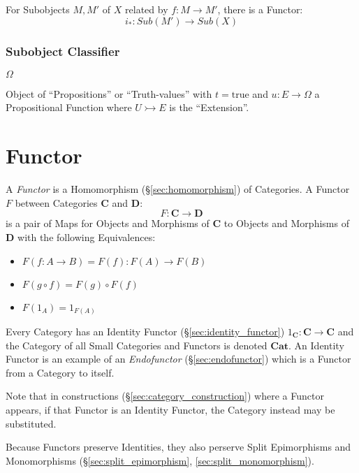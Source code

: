 For Subobjects $M,M'$ of $X$ related by $f : M \rightarrow M'$, there
is a Functor:
\[
  i_* : Sub (M') \rightarrow Sub (X)
\]



\subsubsection{Subobject Classifier}\label{sec:subobject_classifier}

$\Omega$

Object of ``Propositions'' or ``Truth-values'' with $t =
\mathrm{true}$ and $u : E \rightarrow \Omega$ a Propositional Function
where $U \rightarrowtail E$ is the ``Extension''.



\section{Functor}\label{sec:functor}

A \emph{Functor} is a Homomorphism (\S\ref{sec:homomorphism}) of
Categories. A Functor $F$ between Categories $\mathbf{C}$ and
$\mathbf{D}$:
\[
  F : \mathbf{C} \rightarrow \mathbf{D}
\]
is a pair of Maps for Objects and Morphisms of $\mathbf{C}$ to Objects
and Morphisms of $\mathbf{D}$ with the following Equivalences:
\begin{itemize}
\item $F(f : A \rightarrow B) = F(f) : F(A) \rightarrow F(B)$
\item $F(g \circ f) = F(g) \circ F(f)$
\item $F(1_A) = 1_{F(A)}$
\end{itemize}
Every Category has an Identity Functor (\S\ref{sec:identity_functor})
$1_{\mathbf{C}} : \mathbf{C} \rightarrow \mathbf{C}$ and the Category
of all Small Categories and Functors is denoted $\mathbf{Cat}$. An
Identity Functor is an example of an \emph{Endofunctor}
(\S\ref{sec:endofunctor}) which is a Functor from a Category to
itself.

Note that in constructions (\S\ref{sec:category_construction}) where a
Functor appears, if that Functor is an Identity Functor, the Category
instead may be substituted.

Because Functors preserve Identities, they also perserve Split
Epimorphisms and Monomorphisms (\S\ref{sec:split_epimorphism},
\ref{sec:split_monomorphism}).

